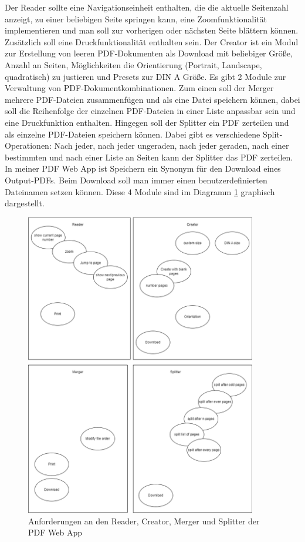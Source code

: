 Der Reader sollte eine Navigationseinheit enthalten, die die aktuelle Seitenzahl anzeigt, zu einer beliebigen Seite springen kann, eine Zoomfunktionalität implementieren und man soll zur vorherigen oder nächsten Seite blättern können. Zusätzlich soll eine Druckfunktionalität enthalten sein. Der Creator ist ein Modul zur Erstellung von leeren PDF-Dokumenten als Download mit beliebiger Größe, Anzahl an Seiten, Möglichkeiten die Orientierung (Portrait, Landscape, quadratisch) zu justieren und Presets zur DIN A Größe. Es gibt 2 Module zur Verwaltung von PDF-Dokumentkombinationen. Zum einen soll der Merger mehrere PDF-Dateien zusammenfügen und als eine Datei speichern können, dabei soll die Reihenfolge der einzelnen PDF-Dateien in einer Liste anpassbar sein und eine Druckfunktion enthalten. Hingegen soll der Splitter ein PDF zerteilen und als einzelne PDF-Dateien speichern können. Dabei gibt es verschiedene Split-Operationen: Nach jeder, nach jeder ungeraden, nach jeder geraden, nach einer bestimmten und nach einer Liste an Seiten kann der Splitter das PDF zerteilen. In meiner PDF Web App ist Speichern ein Synonym für den Download eines Output-PDFs. Beim Download soll man immer einen benutzerdefinierten Dateinamen setzen können. Diese 4 Module sind im Diagramm \ref{fig:modules4} graphisch dargestellt. 

\begin{figure}[!htbp]
	\centering
	\includegraphics[width=0.9\textwidth]{"images/app-funktionen-anforderungen.png"}
	\caption{Anforderungen an den Reader, Creator, Merger und Splitter der PDF Web App}
	\label{fig:modules4}
\end{figure}

